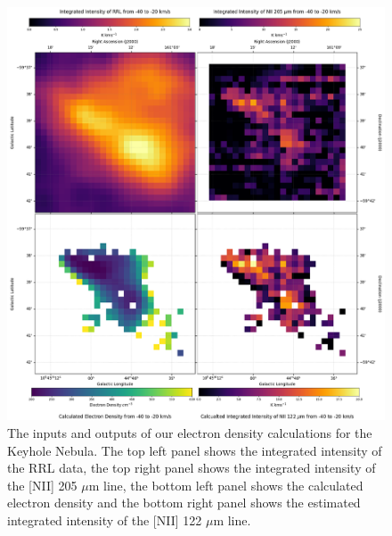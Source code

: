 \begin{figure}
    \centering
    \includegraphics[width=.9\textwidth]{figs/carina/keyhole/keyhole.png}
    \caption[Calculated Electron Density and {[}NII{]} 122 $\mu$m Maps for the Keyhole Nebula]{
        The inputs and outputs of our electron density calculations for the Keyhole Nebula.
        The top left panel shows the integrated intensity of the RRL data, the top right panel shows the integrated intensity of the [NII] 205 $\mu$m line, the bottom left panel shows the calculated electron density and the bottom right panel shows the estimated integrated intensity of the [NII] 122 $\mu$m line.
        }
    \label{carina/fig:result_keyhole}
\end{figure}

